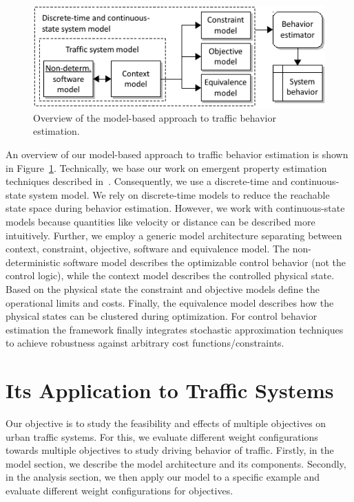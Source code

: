 \documentclass[conference]{../cls/IEEEtran}
\begin{document}
\begin{figure}[b]
	\centering
	\includegraphics{../gfx/framework.pdf}
	\caption{Overview of the model-based approach to traffic behavior estimation.}
	\label{fig:framework}
\end{figure}
An overview of our model-based approach to traffic behavior estimation is shown in Figure~\ref{fig:framework}. Technically, we base our work on emergent property estimation techniques described in~\cite{Hackenberg2012}. Consequently, we use a discrete-time and continuous-state system model. We rely on discrete-time models to reduce the reachable state space during behavior estimation. However, we work with continuous-state models because quantities like velocity or distance can be described more intuitively. Further, we employ a generic model architecture separating between context, constraint, objective, software and equivalence model. The non-deterministic software model describes the optimizable control behavior (not the control logic), while the context model describes the controlled physical state. Based on the physical state the constraint and objective models define the operational limits and costs. Finally, the equivalence model describes how the physical states can be clustered during optimization. For control behavior estimation the framework finally integrates stochastic approximation techniques~\cite{Pereira1991} to achieve robustness against arbitrary cost functions/constraints.

\section{Its Application to Traffic Systems}

Our objective is to study the feasibility and effects of multiple objectives on
urban traffic systems. For this, we evaluate different weight configurations
towards multiple objectives to study driving behavior of traffic. Firstly, in
the model section, we describe the model architecture and its components.
Secondly, in the analysis section, we then apply our model to a specific
example and evaluate different weight configurations for objectives.
\end{document}
